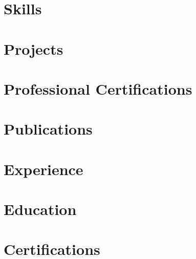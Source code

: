 \documentclass[letter,10pt]{article}
\begin{document}


\section{Skills}


\section{Projects}


\section{Professional Certifications}


\section{Publications}


\section{Experience}



\section{Education}


\section{Certifications}

\end{document}
